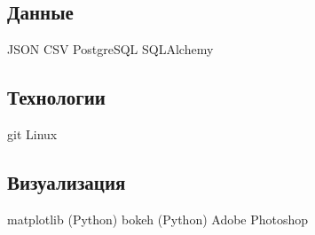 \documentclass[a4paper]{resume}
\begin{document}
\begin{minipage}[t]{0.35\textwidth} {\Large }
\sectionspace

\subsection{Данные}

JSON \textbullet{} CSV \textbullet{} PostgreSQL \textbullet{} SQLAlchemy

\sectionspace

\subsection{Технологии}

git \textbullet{}  Linux

\sectionspace








\subsection{Визуализация}
matplotlib (Python) \textbullet{} bokeh (Python) \textbullet{} Adobe Photoshop
\sectionspace



\end{minipage} {\Large }%
\hfill
%
%
\end{document}

